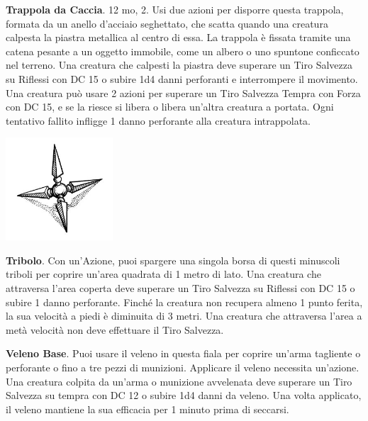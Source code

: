 \begin{multicols}{2}
\textbf{Trappola da Caccia}\hypertarget{Trappola da Caccia}{}\label{Trappola da Caccia}. 12 mo, 2. Usi due azioni per disporre questa trappola, formata da un anello d'acciaio seghettato, che scatta quando una creatura calpesta la piastra metallica al centro di essa. La trappola è fissata tramite una catena pesante a un oggetto immobile, come un albero o uno spuntone conficcato nel terreno. Una creatura che calpesti la piastra deve superare un Tiro Salvezza su Riflessi con DC 15 o subire 1d4 danni perforanti e interrompere il movimento. Una creatura può usare 2 azioni per superare un Tiro Salvezza Tempra con Forza con DC 15, e se la riesce si libera o libera un'altra creatura a portata. Ogni tentativo fallito infligge 1 danno perforante alla creatura intrappolata.

\begin{center}
\includegraphics[width=0.3\textwidth]{immagini/tribolo.png}
\end{center}


\textbf{Tribolo}\label{Tribolo}\hypertarget{Tribolo}{}. Con un'Azione, puoi spargere una singola borsa di questi minuscoli triboli per coprire un'area quadrata di 1 metro di lato. Una creatura che attraversa l'area coperta deve superare un Tiro Salvezza su Riflessi con DC 15 o subire 1 danno perforante. Finché la creatura non recupera almeno 1 punto ferita, la sua velocità a piedi è diminuita di 3 metri. Una creatura che attraversa l'area a metà velocità non deve effettuare il Tiro Salvezza.

\textbf{Veleno Base}\label{Veleno Base}. Puoi usare il veleno in questa fiala per coprire un'arma tagliente o perforante o fino a tre pezzi di munizioni. Applicare il veleno necessita un'azione. Una creatura colpita da un'arma o munizione avvelenata deve superare un Tiro Salvezza su tempra con DC 12 o subire 1d4 danni da veleno.
Una volta applicato, il veleno mantiene la sua efficacia per 1 minuto prima di seccarsi.


\end{multicols}

